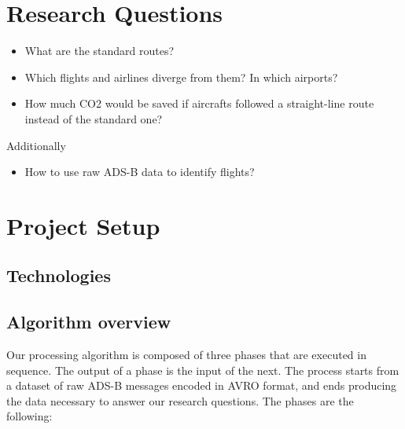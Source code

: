 \documentclass{vldb}
\begin{document}
\section{Research Questions}

\begin{itemize}
  \item What are the standard routes?
  \item Which flights and airlines diverge from them? In which airports?
  \item How much CO2 would be saved if aircrafts followed a straight-line route
  instead of the standard one?
\end{itemize}

Additionally

\begin{itemize}
  \item How to use raw ADS-B data to identify flights?
\end{itemize}

\section{Project Setup}

\subsection{Technologies}

\subsection{Algorithm overview}

Our processing algorithm is composed of three phases that are executed in
sequence. The output of a phase is the input of the next. The process starts
from a dataset of raw ADS-B messages encoded in AVRO format, and ends producing
the data necessary to answer our research questions. The phases are the
following:
\end{document}
